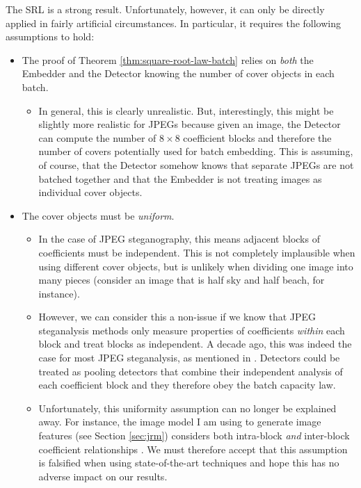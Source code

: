 \documentclass[11pt,a4paper,twoside,openright]{report}
\begin{document}
The SRL is a strong result. Unfortunately, however, it can only be directly applied in fairly artificial circumstances. In particular, it requires the following assumptions to hold:
\begin{itemize}

	\item The proof of Theorem \ref{thm:square-root-law-batch} relies on \textit{both} the Embedder and the Detector knowing the number of cover objects in each batch.
		\begin{itemize}
			\item In general, this is clearly unrealistic. But, interestingly, this might be slightly more realistic for JPEGs because given an image, the Detector can compute the number of $8\times8$ coefficient blocks and therefore the number of covers potentially used for batch embedding. This is assuming, of course, that the Detector somehow knows that separate JPEGs are not batched together and that the Embedder is not treating images as individual cover objects.
		\end{itemize}
	
	\item The cover objects must be \textit{uniform}.
		\begin{itemize}
			\item In the case of JPEG steganography, this means adjacent blocks of coefficients must be independent. This is not completely implausible when using different cover objects, but is unlikely when dividing one image into many pieces (consider an image that is half sky and half beach, for instance).
			\item However, we can consider this a non-issue if we know that JPEG steganalysis methods only measure properties of coefficients \textit{within} each block and treat blocks as independent. A decade ago, this was indeed the case for most JPEG steganalysis, as mentioned in \cite{2008-paper}. Detectors could be treated as pooling detectors that combine their independent analysis of each coefficient block and they therefore obey the batch capacity law.
			\item Unfortunately, this uniformity assumption can no longer be explained away. For instance, the image model I am using to generate image features (see Section \ref{sec:jrm}) considers both intra-block \textit{and} inter-block coefficient relationships \cite{jrm-paper}. We must therefore accept that this assumption is falsified when using state-of-the-art techniques and hope this has no adverse impact on our results. %
		\end{itemize}


\end{itemize}
\end{document}
